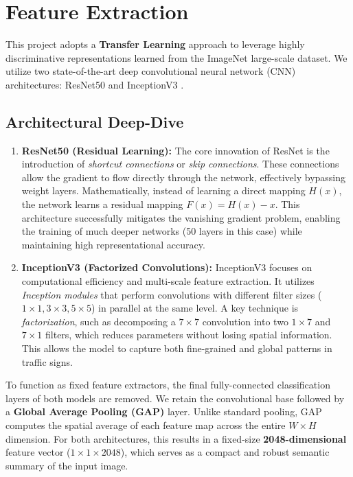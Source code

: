 \section{Feature Extraction}
This project adopts a \textbf{Transfer Learning} approach to leverage highly discriminative representations learned from the ImageNet large-scale dataset. We utilize two state-of-the-art deep convolutional neural network (CNN) architectures: ResNet50 \cite{resnet} and InceptionV3 \cite{inception}. 

\subsection{Architectural Deep-Dive}
\begin{enumerate}
    \item \textbf{ResNet50 (Residual Learning):} The core innovation of ResNet is the introduction of \textit{shortcut connections} or \textit{skip connections}. These connections allow the gradient to flow directly through the network, effectively bypassing weight layers. Mathematically, instead of learning a direct mapping $H(x)$, the network learns a residual mapping $F(x) = H(x) - x$. This architecture successfully mitigates the vanishing gradient problem, enabling the training of much deeper networks (50 layers in this case) while maintaining high representational accuracy.
    
    \item \textbf{InceptionV3 (Factorized Convolutions):} InceptionV3 focuses on computational efficiency and multi-scale feature extraction. It utilizes \textit{Inception modules} that perform convolutions with different filter sizes ($1 \times 1, 3 \times 3, 5 \times 5$) in parallel at the same level. A key technique is \textit{factorization}, such as decomposing a $7 \times 7$ convolution into two $1 \times 7$ and $7 \times 1$ filters, which reduces parameters without losing spatial information. This allows the model to capture both fine-grained and global patterns in traffic signs.
\end{enumerate}

To function as fixed feature extractors, the final fully-connected classification layers of both models are removed. We retain the convolutional base followed by a \textbf{Global Average Pooling (GAP)} layer. Unlike standard pooling, GAP computes the spatial average of each feature map across the entire $W \times H$ dimension. For both architectures, this results in a fixed-size \textbf{2048-dimensional} feature vector ($1 \times 1 \times 2048$), which serves as a compact and robust semantic summary of the input image.

